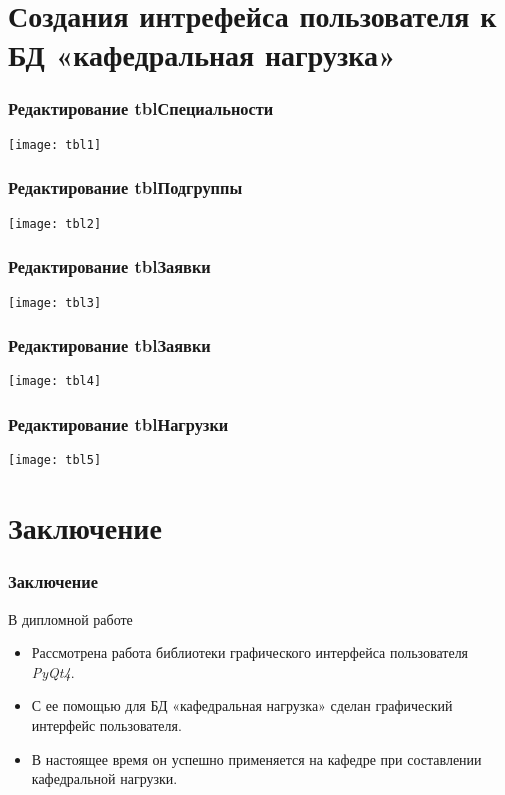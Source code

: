 \documentclass[10pt,utf8,presentation,notheorems,xcolor=dvipsnames,compress]{beamer}
\begin{document}
\section{Создания интрефейса пользователя к БД «кафедральная нагрузка»}

\begin{frame}
\frametitle{Редактирование tblСпециальности}
\begin{center}
\texttt{[image: tbl1]}%
\end{center}
\end{frame}

\begin{frame}
\frametitle{Редактирование tblПодгруппы}
\begin{center}
\texttt{[image: tbl2]}%
\end{center}
\end{frame}

\begin{frame}
\frametitle{Редактирование tblЗаявки}
\begin{center}
\texttt{[image: tbl3]}%
\end{center}
\end{frame}

\begin{frame}
\frametitle{Редактирование tblЗаявки}
\begin{center}
\texttt{[image: tbl4]}%
\end{center}
\end{frame}

\begin{frame}
\frametitle{Редактирование tblНагрузки}
\begin{center}
\texttt{[image: tbl5]}%
\end{center}
\end{frame}

\section{Заключение}
\begin{frame}
\frametitle{Заключение}
\begin{block}{В дипломной работе}
\begin{itemize}
 \item Рассмотрена работа библиотеки графического интерфейса пользователя \emph{PyQt4}.
 \item С ее помощью для БД «кафедральная нагрузка» сделан графический интерфейс пользователя.
 \item В настоящее время он успешно применяется на кафедре
 при составлении
кафедральной нагрузки. 
\end{itemize}
\end{block}
\end{frame}
\end{document}
